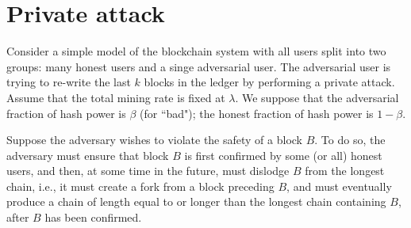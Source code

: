 \documentclass{article}
\begin{document}


\section*{Private attack}
 Consider a simple model of the blockchain system with all users split into two groups: many honest users  and a singe adversarial user. The adversarial user is  trying to re-write the last $k$ blocks in the ledger by performing a private attack. Assume that the total mining rate is fixed at $\lambda$. We suppose that the adversarial fraction of hash power is $\beta$ (for 
 ``bad"); the honest fraction of hash power is $1-\beta$. 
 
Suppose the adversary wishes to violate the safety of a block $B$. To do so, the adversary must ensure that block $B$ is first confirmed by some (or all) honest users, and then, at some time in the future, must dislodge $B$ from the longest chain,  i.e., it must create a fork from a block preceding $B$, and must eventually produce a chain of length equal to or longer than the longest chain containing $B$, after $B$ has been confirmed. 
\end{document}
